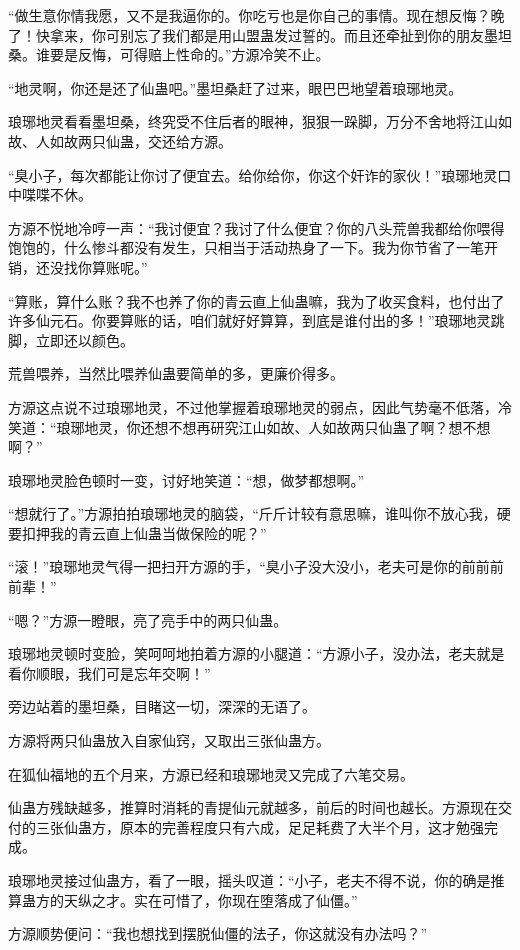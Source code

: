 \begin{this_body}
“做生意你情我愿，又不是我逼你的。你吃亏也是你自己的事情。现在想反悔？晚了！快拿来，你可别忘了我们都是用山盟蛊发过誓的。而且还牵扯到你的朋友墨坦桑。谁要是反悔，可得赔上性命的。”方源冷笑不止。

“地灵啊，你还是还了仙蛊吧。”墨坦桑赶了过来，眼巴巴地望着琅琊地灵。

琅琊地灵看看墨坦桑，终究受不住后者的眼神，狠狠一跺脚，万分不舍地将江山如故、人如故两只仙蛊，交还给方源。

“臭小子，每次都能让你讨了便宜去。给你给你，你这个奸诈的家伙！”琅琊地灵口中喋喋不休。

方源不悦地冷哼一声：“我讨便宜？我讨了什么便宜？你的八头荒兽我都给你喂得饱饱的，什么惨斗都没有发生，只相当于活动热身了一下。我为你节省了一笔开销，还没找你算账呢。”

“算账，算什么账？我不也养了你的青云直上仙蛊嘛，我为了收买食料，也付出了许多仙元石。你要算账的话，咱们就好好算算，到底是谁付出的多！”琅琊地灵跳脚，立即还以颜色。

荒兽喂养，当然比喂养仙蛊要简单的多，更廉价得多。

方源这点说不过琅琊地灵，不过他掌握着琅琊地灵的弱点，因此气势毫不低落，冷笑道：“琅琊地灵，你还想不想再研究江山如故、人如故两只仙蛊了啊？想不想啊？”

琅琊地灵脸色顿时一变，讨好地笑道：“想，做梦都想啊。”

“想就行了。”方源拍拍琅琊地灵的脑袋，“斤斤计较有意思嘛，谁叫你不放心我，硬要扣押我的青云直上仙蛊当做保险的呢？”

“滚！”琅琊地灵气得一把扫开方源的手，“臭小子没大没小，老夫可是你的前前前前辈！”

“嗯？”方源一瞪眼，亮了亮手中的两只仙蛊。

琅琊地灵顿时变脸，笑呵呵地拍着方源的小腿道：“方源小子，没办法，老夫就是看你顺眼，我们可是忘年交啊！”

旁边站着的墨坦桑，目睹这一切，深深的无语了。

方源将两只仙蛊放入自家仙窍，又取出三张仙蛊方。

在狐仙福地的五个月来，方源已经和琅琊地灵又完成了六笔交易。

仙蛊方残缺越多，推算时消耗的青提仙元就越多，前后的时间也越长。方源现在交付的三张仙蛊方，原本的完善程度只有六成，足足耗费了大半个月，这才勉强完成。

琅琊地灵接过仙蛊方，看了一眼，摇头叹道：“小子，老夫不得不说，你的确是推算蛊方的天纵之才。实在可惜了，你现在堕落成了仙僵。”

方源顺势便问：“我也想找到摆脱仙僵的法子，你这就没有办法吗？”


\end{this_body}
